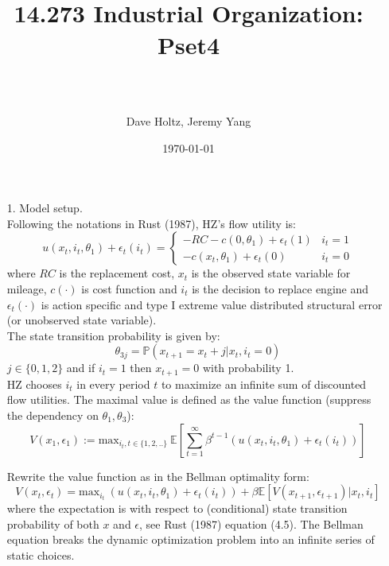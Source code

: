 \documentclass[paper=a4, fontsize=11pt]{scrartcl} %
\title{	
\normalfont \normalsize 

\horrule{0.5pt} \\[0.4cm] %
\huge 14.273 Industrial Organization: Pset4 \\ %
\horrule{.5pt} \\[0.4cm] %
}
\author{Dave Holtz, Jeremy Yang} %
\date{\normalsize\today} %
\numberwithin{equation}{section} %
\numberwithin{figure}{section} %
\numberwithin{table}{section} %
\begin{document}
\maketitle
\begin{itemize}
\item[1.] Model setup.\\

Following the notations in Rust (1987), HZ's flow utility is:
\[u(x_t,i_t,\theta_1)+\epsilon_t(i_t) = 
\begin{cases}
-RC-c(0,\theta_1)+\epsilon_t(1) & i_t = 1\\
-c(x_t,\theta_1)+\epsilon_t(0) & i_t=0
\end{cases}\]
where $RC$ is the replacement cost, $x_t$ is the observed state variable for mileage, $c(\cdot)$ is cost function and $i_t$ is the decision to replace engine and $\epsilon_t(\cdot)$ is action specific and type I extreme value distributed structural error (or unobserved state variable).\\

The state transition probability is given by:
\[\theta_{3j} = \mathbb{P}(x_{t+1}=x_t+j|x_t,i_t=0)\]
$j \in \{0,1,2\}$ and if $i_{t}=1$ then $x_{t+1}=0$ with probability 1.\\

HZ chooses $i_t$ in every period $t$ to maximize an infinite sum of discounted flow utilities. The maximal value is defined as the value function (suppress the dependency on $\theta_1, \theta_3$):
\[V(x_1,\epsilon_1) := \text{max}_{i_t, t\in\{1,2,..\}}\ \mathbb{E}[\sum_{t=1}^\infty \beta^{t-1} (u(x_t,i_t,\theta_1)+\epsilon_t(i_t))]\]

Rewrite the value function as in the Bellman optimality form:
\[V(x_t, \epsilon_t) = \text{max}_{i_t} \ (u(x_t,i_t,\theta_1)+\epsilon_t(i_t)) + \beta \mathbb{E}[V(x_{t+1},\epsilon_{t+1})|x_t, i_t]\]
where the expectation is with respect to (conditional) state transition probability of both $x$ and $\epsilon$, see Rust (1987) equation (4.5). The Bellman equation breaks the dynamic optimization problem into an infinite series of static choices. 



\end{itemize}
\end{document}
